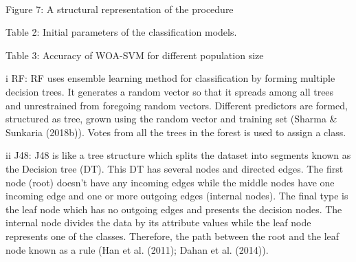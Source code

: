 \documentclass{article}
\begin{document}
\\
Figure 7: A structural representation of the procedure


Table 2: Initial parameters of the classification models.




Table 3: Accuracy of WOA-SVM for different population size




i RF: RF uses ensemble learning method for classification by forming multiple decision trees. It generates a random vector so that it spreads among all trees and unrestrained from foregoing random vectors. Different predictors are formed, structured as tree, grown using the random vector and training set (Sharma & Sunkaria (2018b)). Votes from all the trees in the forest is used to assign a class.


ii J48: J48 is like a tree structure which splits the dataset into segments known as the Decision tree (DT). This DT has several nodes and directed edges. The first node (root) doesn’t have any incoming edges while the middle nodes have one incoming edge and one or more outgoing edges (internal nodes). The final type is the leaf node which has no outgoing edges and presents the decision nodes. The internal node divides the data by its attribute values while the leaf node represents one of the classes. Therefore, the path between the root and the leaf node known as a rule (Han et al. (2011); Dahan et al. (2014)).
\end{document}
